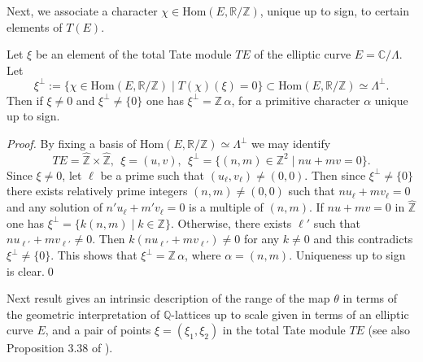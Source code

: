 \documentclass[graybox, envcountsect%
]{svmult}
\def\Hom{{\rm Hom}}
\def\C{{\mathbb C}}
\def\Q{{\mathbb Q}}
\def\R{{\mathbb R}}
\def\Z{{\mathbb Z}}
\def\Hom {{\mbox{Hom}}}
\begin{document}
 Next, we  associate a character $\chi\in \Hom(E,\R/\Z)$, unique up to sign, to certain elements of $T(E)$.
 
\begin{lemma}\label{uniquetate}
Let $\xi$ be an element of the total Tate module $TE$ of the elliptic curve $E=\C/\Lambda$. Let 
$$
\xi^\perp:= \{\chi\in \Hom(E,\R/\Z)\mid T(\chi)(\xi)=0\}\subset \Hom(E,\R/\Z)\simeq \Lambda^\perp. 
$$
Then if $\xi \neq 0$ and $\xi^\perp\neq \{0\}$ one has $\xi^\perp= \Z\,\alpha$, for a primitive character $\alpha$ unique up to sign.
\end{lemma}
\begin{proof} By fixing  a basis of $\Hom(E,\R/\Z)\simeq \Lambda^\perp$ we may identify 
$$
TE=\hat \Z \times \hat \Z, \ \ \xi=(u,v), \ \ \xi^\perp=\{(n,m)\in \Z^2\mid nu+mv=0\}.
$$
Since $\xi \neq 0$, let $\ell$ be a prime such that $(u_\ell,v_\ell)\neq (0,0)$. Then since $\xi^\perp\neq \{0\}$ there exists relatively prime integers $(n,m)\neq (0,0)$ such that $n u_\ell+m v_\ell=0$ and any solution of $n' u_\ell+m' v_\ell=0$ is a multiple of $(n,m)$. If $nu+mv=0$ in $\hat \Z$ one has $\xi^\perp=\{k(n,m)\mid k\in \Z\}$. Otherwise, there exists $\ell'$ such that $n u_{\ell'}+m v_{\ell'}\neq 0$. Then $k(n u_{\ell'}+m v_{\ell'})\neq 0$ for any $k\neq 0$ and this contradicts $\xi^\perp\neq \{0\}$. This shows that $\xi^\perp= \Z\,\alpha$, where $\alpha=(n,m)$. Uniqueness up to sign is clear.\qed\end{proof}
 
Next result gives an intrinsic description of the range of the map $\theta$ in terms of the geometric interpretation of $\Q$-lattices up to scale  given in terms of an elliptic curve $E$, and a
pair of points $\xi=(\xi_1,\xi_2)$ in the total Tate module $TE$ (see also  Proposition 3.38 of \cite{cmbook}).
\end{document}
